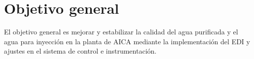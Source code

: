 \section{Objetivo general}
El objetivo general es mejorar y estabilizar la calidad del agua purificada y el agua para inyección en la planta de AICA mediante la implementación del EDI y ajustes en el sistema de control e instrumentación.